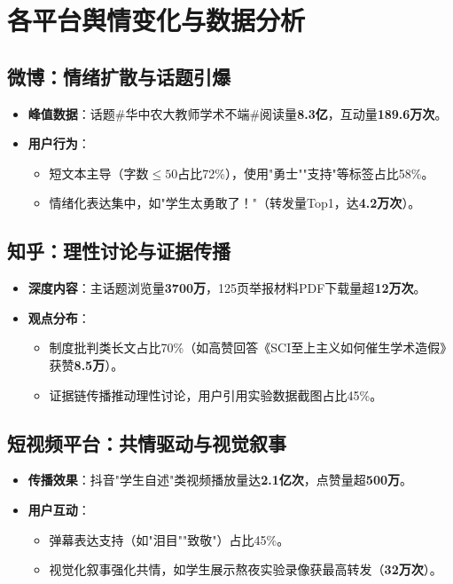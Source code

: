 \documentclass[12pt,a4paper]{article}
\begin{document}
\section{各平台舆情变化与数据分析}
\subsection{微博：情绪扩散与话题引爆}
\begin{itemize}[leftmargin=*]
    \item \textbf{峰值数据}：话题\#华中农大教师学术不端\#阅读量\textbf{8.3亿}，互动量\textbf{189.6万次}。
    \item \textbf{用户行为}：
    \begin{itemize}
        \item 短文本主导（字数$\leq50$占比72\%），使用"勇士""支持"等标签占比58\%。
        \item 情绪化表达集中，如"学生太勇敢了！"（转发量Top1，达\textbf{4.2万次}）。
    \end{itemize}
\end{itemize}

\subsection{知乎：理性讨论与证据传播}
\begin{itemize}[leftmargin=*]
    \item \textbf{深度内容}：主话题浏览量\textbf{3700万}，125页举报材料PDF下载量超\textbf{12万次}。
    \item \textbf{观点分布}：
    \begin{itemize}
        \item 制度批判类长文占比70\%（如高赞回答《SCI至上主义如何催生学术造假》获赞\textbf{8.5万}）。
        \item 证据链传播推动理性讨论，用户引用实验数据截图占比45\%。
    \end{itemize}
\end{itemize}

\subsection{短视频平台：共情驱动与视觉叙事}
\begin{itemize}[leftmargin=*]
    \item \textbf{传播效果}：抖音"学生自述"类视频播放量达\textbf{2.1亿次}，点赞量超\textbf{500万}。
    \item \textbf{用户互动}：
    \begin{itemize}
        \item 弹幕表达支持（如"泪目""致敬"）占比45\%。
        \item 视觉化叙事强化共情，如学生展示熬夜实验录像获最高转发（\textbf{32万次}）。
    \end{itemize}
\end{itemize}
\end{document}
